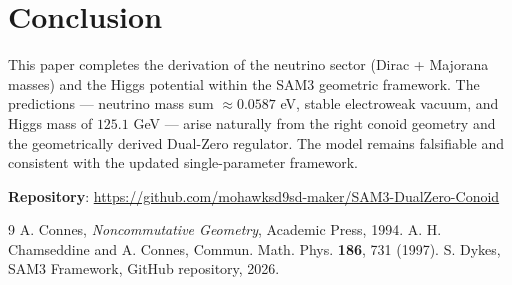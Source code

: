 \documentclass[11pt,a4paper]{article}
\begin{document}
\section{Conclusion}
This paper completes the derivation of the neutrino sector (Dirac + Majorana masses) and the Higgs potential within the SAM3 geometric framework. The predictions — neutrino mass sum \(\approx 0.0587\) eV, stable electroweak vacuum, and Higgs mass of \(125.1\) GeV — arise naturally from the right conoid geometry and the geometrically derived Dual-Zero regulator. The model remains falsifiable and consistent with the updated single-parameter framework.

\textbf{Repository}: \url{https://github.com/mohawksd9sd-maker/SAM3-DualZero-Conoid}

\begin{thebibliography}{9}
 A. Connes, \textit{Noncommutative Geometry}, Academic Press, 1994.
 A. H. Chamseddine and A. Connes, Commun. Math. Phys. \textbf{186}, 731 (1997).
 S. Dykes, SAM3 Framework, GitHub repository, 2026.
\end{thebibliography}
\end{document}
